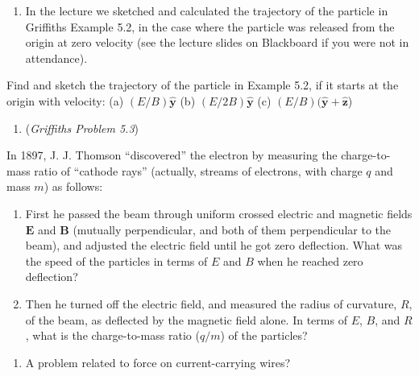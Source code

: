 \documentclass[
  letterpaper,
  DIV=11,
  numbers=noendperiod]{scrreprt}
\providecommand{\tightlist}{%
  \setlength{\itemsep}{0pt}\setlength{\parskip}{0pt}}\usepackage{longtable,booktabs,array}
\begin{document}
\begin{enumerate}
\def\labelenumi{\arabic{enumi})}
\tightlist
\item
  In the lecture we sketched and calculated the trajectory of the
  particle in Griffiths Example 5.2, in the case where the particle was
  released from the origin at zero velocity (see the lecture slides on
  Blackboard if you were not in attendance).
\end{enumerate}

Find and sketch the trajectory of the particle in Example 5.2, if it
starts at the origin with velocity: (a)
\((E/B) \hat{\mathrm{\mathbf{y}}}\) (b)
\((E/2B) \hat{\mathrm{\mathbf{y}}}\) (c)
\((E/B) (\hat{\mathrm{\mathbf{y}}} + \hat{\mathrm{\mathbf{z}}}\))

\begin{enumerate}
\def\labelenumi{\arabic{enumi})}
\setcounter{enumi}{1}
\tightlist
\item
  (\emph{Griffiths Problem 5.3})
\end{enumerate}

In 1897, J. J. Thomson ``discovered'' the electron by measuring the
charge-to-mass ratio of ``cathode rays'' (actually, streams of
electrons, with charge \(q\) and mass \(m\)) as follows:

\begin{enumerate}
\def\labelenumi{(\alph{enumi})}
\item
  First he passed the beam through uniform crossed electric and magnetic
  fields \(\mathrm{\mathbf{E}}\) and \(\mathrm{\mathbf{B}}\) (mutually
  perpendicular, and both of them perpendicular to the beam), and
  adjusted the electric field until he got zero deflection. What was the
  speed of the particles in terms of \(E\) and \(B\) when he reached
  zero deflection?
\item
  Then he turned off the electric field, and measured the radius of
  curvature, \(R\), of the beam, as deflected by the magnetic field
  alone. In terms of \(E\), \(B\), and \(R\), what is the charge-to-mass
  ratio (\(q/m\)) of the particles?
\end{enumerate}

\begin{enumerate}
\def\labelenumi{\arabic{enumi})}
\setcounter{enumi}{2}
\tightlist
\item
  A problem related to force on current-carrying wires?
\end{enumerate}

\end{document}
